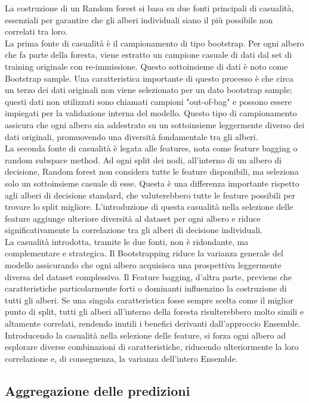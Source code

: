 \documentclass[a4paper,12pt]{report}
\begin{document}
	La costruzione di un Random forest si basa su due fonti principali di casualità, essenziali per garantire che gli alberi individuali siano il più possibile non correlati tra loro. \\
	La prima fonte di casualità è il campionamento di tipo bootstrap. Per ogni albero che fa parte della foresta, viene estratto un campione casuale di dati dal set di training originale con re-immissione. Questo sottoinsieme di dati è noto come Bootstrap sample. Una caratteristica importante di questo processo è che circa un terzo dei dati originali non viene selezionato per un dato bootstrap sample; questi dati non utilizzati sono chiamati campioni "out-of-bag" e possono essere impiegati per la validazione interna del modello. Questo tipo di campionamento assicura che ogni albero sia addestrato su un sottoinsieme leggermente diverso dei dati originali, promuovendo una diversità fondamentale tra gli alberi. \\
	La seconda fonte di casualità è legata alle features, nota come feature bagging o random subspace method. Ad ogni split dei nodi, all'interno di un albero di decisione, Random forest non considera tutte le feature disponibili, ma seleziona solo un sottoinsieme casuale di esse. Questa è una differenza importante rispetto agli alberi di decisione standard, che valuterebbero tutte le feature possibili per trovare lo split migliore. L'introduzione di questa casualità nella selezione delle feature aggiunge ulteriore diversità al dataset per ogni albero e riduce significativamente la correlazione tra gli alberi di decisione individuali. \\
	La casualità introdotta, tramite le due fonti, non è ridondante, ma complementare e strategica. Il Bootstrapping riduce la varianza generale del modello assicurando che ogni albero acquisisca una prospettiva leggermente diversa del dataset complessivo. Il Feature bagging, d'altra parte, previene che caratteristiche particolarmente forti o dominanti influenzino la costruzione di tutti gli alberi. Se una singola caratteristica fosse sempre scelta come il miglior punto di split, tutti gli alberi all'interno della foresta risulterebbero molto simili e altamente correlati, rendendo inutili i benefici derivanti dall'approccio Ensemble. Introducendo la casualità nella selezione delle feature, si forza ogni albero ad esplorare diverse combinazioni di caratteristiche, riducendo ulteriormente la loro correlazione e, di conseguenza, la varianza dell'intero Ensemble.
	
	\subsection{Aggregazione delle predizioni}
	
\end{document}
